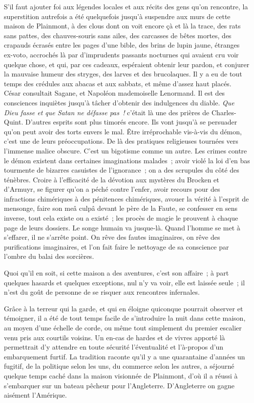 \documentclass[french,twoside]{book} %
\begin{document}
S’il faut ajouter foi aux légendes locales et aux récits des gens qu’on rencontre, la superstition autrefois a été quelquefois jusqu’à suspendre aux murs de cette maison de Plainmont, à des clous dont on voit encore çà et là la trace, des rats sans pattes, des chauves-souris sans ailes, des carcasses de bêtes mortes, des crapauds écrasés entre les pages d’une bible, des brins de lupin jaune, étranges ex-voto, accrochés là par d’imprudents passants nocturnes qui avaient cru voir  quelque chose, et qui, par ces cadeaux, espéraient obtenir leur pardon, et conjurer la mauvaise humeur des stryges, des larves et des brucolaques. Il y a eu de tout temps des crédules aux abacas et aux sabbats, et même d’assez haut placés. César consultait Sagane, et Napoléon mademoiselle Lenormand. Il est des consciences inquiètes jusqu’à tâcher d’obtenir des indulgences du diable. \emph{Que Dieu fasse et que Satan ne défasse pas !} c’était là une des prières de Charles-Quint. D’autres esprits sont plus timorés encore. Ils vont jusqu’à se persuader qu’on peut avoir des torts envers le mal. Être irréprochable vis-à-vis du démon, c’est une de leurs préoccupations. De là des pratiques religieuses tournées vers l’immense malice obscure. C’est un bigotisme comme un autre. Les crimes contre le démon existent dans certaines imaginations malades ; avoir violé la loi d’en bas tourmente de bizarres casuistes de l’ignorance ; on a des scrupules du côté des ténèbres. Croire à l’efficacité de la dévotion aux mystères du Brocken et d’Armuyr, se figurer qu’on a péché contre l’enfer, avoir recours pour des infractions chimériques à des pénitences chimériques, avouer la vérité à l’esprit de mensonge, faire son meâ culpâ devant le père de la Faute, se confesser en sens inverse, tout cela existe ou a existé ; les procès de magie le prouvent à chaque page de leurs dossiers. Le songe humain va jusque-là. Quand l’homme se met à s’effarer, il ne s’arrête point. On rêve des fautes imaginaires, on rêve des purifications imaginaires, et l’on fait faire le nettoyage de sa conscience par l’ombre du balai des sorcières.\par
 Quoi qu’il en soit, si cette maison a des aventures, c’est son affaire ; à part quelques hasards et quelques exceptions, nul n’y va voir, elle est laissée seule ; il n’est du goût de personne de se risquer aux rencontres infernales.\par
Grâce à la terreur qui la garde, et qui en éloigne quiconque pourrait observer et témoigner, il a été de tout temps facile de s’introduire la nuit dans cette maison, au moyen d’une échelle de corde, ou même tout simplement du premier escalier venu pris aux courtils voisins. Un en-cas de hardes et de vivres apporté là permettrait d’y attendre en toute sécurité l’éventualité et l’à-propos d’un embarquement furtif. La tradition raconte qu’il y a une quarantaine d’années un fugitif, de la politique selon les uns, du commerce selon les autres, a séjourné quelque temps caché dans la maison visionnée de Plainmont, d’où il a réussi à s’embarquer sur un bateau pêcheur pour l’Angleterre. D’Angleterre on gagne aisément l’Amérique.\par
\end{document}
